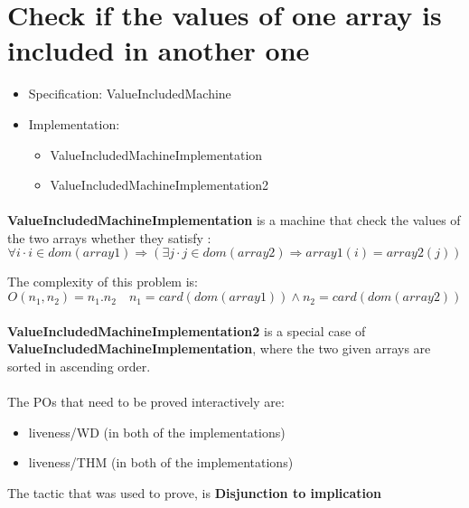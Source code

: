 \section{Check if the values of one array is included in another one}

\begin{itemize}
\item Specification: ValueIncludedMachine
\item Implementation:
\begin{itemize}
	\item ValueIncludedMachineImplementation
	\item ValueIncludedMachineImplementation2
\end{itemize}
\end{itemize}

\paragraph{}
\textbf{ValueIncludedMachineImplementation} is a machine that check the values of the two arrays whether they satisfy :
$$
\forall{i}\cdot i \in dom(array1) \Rightarrow (\exists j \cdot j \in dom(array2) \Rightarrow array1(i) = array2(j))
$$

The complexity of this problem is:
$$
O(n_{1}, n_{2}) = n_{1}. n_{2} \quad  n_{1}=card(dom(array1)) \land n_{2}=card(dom(array2))
$$
\paragraph{}
\textbf{ValueIncludedMachineImplementation2} is a special case of \textbf{ValueIncludedMachineImplementation}, where the two given arrays are sorted in ascending order.

\paragraph{}
The POs that need to be proved interactively are:
\begin{itemize}
\item liveness/WD (in both of the implementations)
\item liveness/THM (in both of the implementations)
\end{itemize}

The tactic that was used to prove, is \textbf{Disjunction to implication}